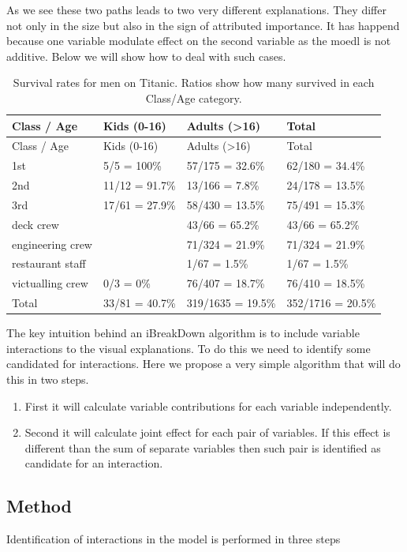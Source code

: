 \documentclass[12pt,]{krantz}
\providecommand{\tightlist}{%
  \setlength{\itemsep}{0pt}\setlength{\parskip}{0pt}}
\theoremstyle{definition}
\theoremstyle{definition}
\theoremstyle{definition}
\theoremstyle{remark}
\begin{document}
As we see these two paths leads to two very different explanations. They
differ not only in the size but also in the sign of attributed
importance. It has happend because one variable modulate effect on the
second variable as the moedl is not additive. Below we will show how to
deal with such cases.

\begin{longtable}[]{@{}llll@{}}
\caption{\label{tab:titanicMaleSurvival} Survival rates for men on Titanic.
Ratios show how many survived in each Class/Age
category.}\tabularnewline
\toprule
Class / Age & Kids (0-16) & Adults (\textgreater{}16) &
Total\tabularnewline
\midrule
\endfirsthead
\toprule
Class / Age & Kids (0-16) & Adults (\textgreater{}16) &
Total\tabularnewline
\midrule
\endhead
1st & 5/5 = 100\% & 57/175 = 32.6\% & 62/180 = 34.4\%\tabularnewline
2nd & 11/12 = 91.7\% & 13/166 = 7.8\% & 24/178 = 13.5\%\tabularnewline
3rd & 17/61 = 27.9\% & 58/430 = 13.5\% & 75/491 = 15.3\%\tabularnewline
deck crew & & 43/66 = 65.2\% & 43/66 = 65.2\%\tabularnewline
engineering crew & & 71/324 = 21.9\% & 71/324 = 21.9\%\tabularnewline
restaurant staff & & 1/67 = 1.5\% & 1/67 = 1.5\%\tabularnewline
victualling crew & 0/3 = 0\% & 76/407 = 18.7\% & 76/410 =
18.5\%\tabularnewline
Total & 33/81 = 40.7\% & 319/1635 = 19.5\% & 352/1716 =
20.5\%\tabularnewline
\bottomrule
\end{longtable}

The key intuition behind an iBreakDown algorithm is to include variable
interactions to the visual explanations. To do this we need to identify
some candidated for interactions. Here we propose a very simple
algorithm that will do this in two steps.

\begin{enumerate}
\def\labelenumi{\arabic{enumi}.}
\tightlist
\item
  First it will calculate variable contributions for each variable
  independently.
\item
  Second it will calculate joint effect for each pair of variables. If
  this effect is different than the sum of separate variables then such
  pair is identified as candidate for an interaction.
\end{enumerate}

\hypertarget{method-1}{%
\subsection{Method}\label{method-1}}

Identification of interactions in the model is performed in three steps
\citep{iBreakDownRPackage}
\end{document}
